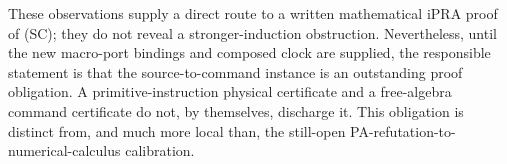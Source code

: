 These observations supply a direct route to a written mathematical
$\mathrm{iPRA}$ proof of (SC); they do not reveal a stronger-induction
obstruction.  Nevertheless, until the new macro-port bindings and composed
clock are supplied, the responsible statement is that the source-to-command
instance is an outstanding proof obligation.  A primitive-instruction
physical certificate and a free-algebra command certificate do not, by
themselves, discharge it.  This obligation is distinct from, and much more
local than, the still-open PA-refutation-to-numerical-calculus calibration.
